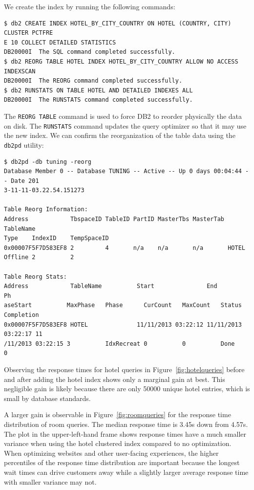 \documentclass[letterpaper]{article}%
\begin{document}
We create the index by running the following commands:
\begin{Verbatim}[frame=single]
$ db2 CREATE INDEX HOTEL_BY_CITY_COUNTRY ON HOTEL (COUNTRY, CITY) CLUSTER PCTFRE
E 10 COLLECT DETAILED STATISTICS
DB20000I  The SQL command completed successfully.
$ db2 REORG TABLE HOTEL INDEX HOTEL_BY_CITY_COUNTRY ALLOW NO ACCESS INDEXSCAN
DB20000I  The REORG command completed successfully.
$ db2 RUNSTATS ON TABLE HOTEL AND DETAILED INDEXES ALL
DB20000I  The RUNSTATS command completed successfully.
\end{Verbatim}
The \texttt{REORG TABLE} command is used to force DB2 to reorder physically the
data on disk. The \texttt{RUNSTATS} command updates the query optimizer so that
it may use the new index. We can confirm the reorganization of the table data
using the \texttt{db2pd} utility:
\begin{Verbatim}[frame=single]
$ db2pd -db tuning -reorg
Database Member 0 -- Database TUNING -- Active -- Up 0 days 00:04:44 -- Date 201
3-11-11-03.22.54.151273

Table Reorg Information:
Address            TbspaceID TableID PartID MasterTbs MasterTab TableName       
Type    IndexID    TempSpaceID
0x00007F5F7D583EF8 2         4       n/a    n/a       n/a       HOTEL           
Offline 2          2

Table Reorg Stats:
Address            TableName          Start               End                 Ph
aseStart          MaxPhase   Phase      CurCount   MaxCount   Status  Completion
0x00007F5F7D583EF8 HOTEL              11/11/2013 03:22:12 11/11/2013 03:22:17 11
/11/2013 03:22:15 3          IdxRecreat 0          0          Done    0
\end{Verbatim}

Observing the response times for hotel queries in Figure~\ref{fig:hotelqueries}
before and after adding the hotel index shows only a marginal gain at best.
This negligible gain is likely because there are only 50000 unique hotel
entries, which is small by database standards.

A larger gain is observable in Figure~\ref{fig:roomqueries} for the response
time distribution of room queries. The median response time is 3.45s down from
4.57s. The plot in the upper-left-hand frame shows response times have a much
smaller variance when using the hotel clustered index compared to no
optimization. When optimizing websites and other user-facing experiences, the
higher percentiles of the response time distribution are important because the
longest wait times can drive customers away while a slightly larger average
response time with smaller variance may not.
\end{document}

